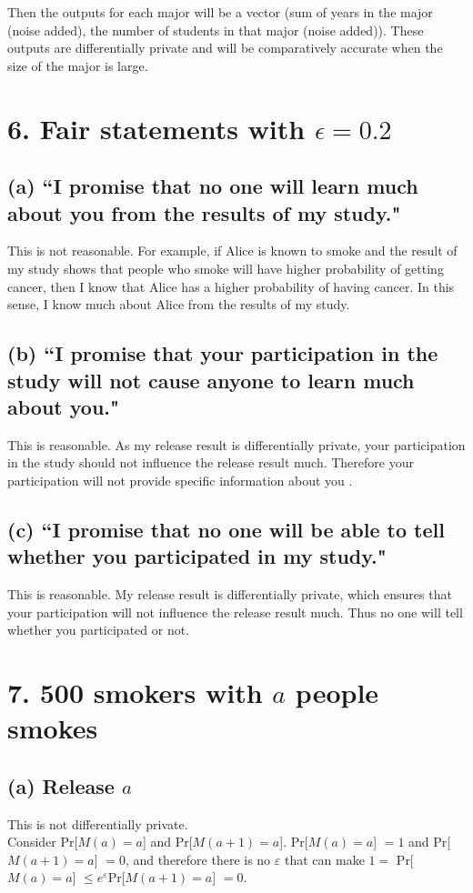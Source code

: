 \documentclass{article}
\begin{document}
Then the outputs for each major will be a vector (sum of years in the major (noise added), the number of students in that major (noise added)). These outputs are differentially private and will be comparatively accurate when the size of the major is large. 

\section*{6. Fair statements with $\epsilon = 0.2$}
\subsection*{(a) ``I promise that no one will learn much about you from the results of my study."}
This is not reasonable. For example, if Alice is known to smoke and the result of my study shows that people who smoke will have higher probability of getting cancer, then I know that Alice has a higher probability of having cancer. In this sense, I know much about Alice from the results of my study. 
\subsection*{(b) ``I promise that your participation in the study will not cause anyone to learn much about you."}
This is reasonable. As my release result is differentially private, your participation in the study should not influence the release result much. Therefore your participation will not provide specific information about you .
\subsection*{(c) ``I promise that no one will be able to tell whether you participated in my study."}
This is reasonable. My release result is differentially private, which ensures that your participation will not influence the release result much. Thus no one will tell whether you participated or not.

\section*{7. 500 smokers with $a$ people smokes}
\subsection*{(a) Release $a$}
This is not differentially private. \\
Consider Pr[$M(a)=a$] and Pr[$M(a+1)=a$]. Pr[$M(a)=a$] $= 1$ and Pr[$M(a+1)=a$] $= 0$, and therefore there is no $\varepsilon$ that can make $1=$ Pr[$M(a)=a$] $ \leq e^{\varepsilon}$Pr[$M(a+1)=a$] $= 0$.
\end{document}
